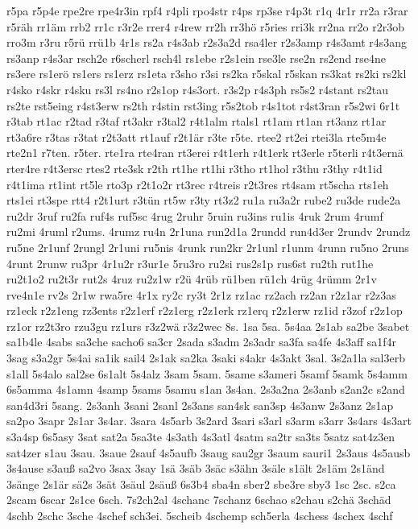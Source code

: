 {r5pa
r5p4e
rpe2re
rpe4r3in
rpf4
r4pli
rpo4str
r4ps
rp3se
r4p3t
r1q
4r1r
rr2a
r3rar
r5räh
rr1äm
rrb2
rr1c
r3r2e
rrer4
r4rew
rr2h
rr3hö
r5ries
rri3k
rr2na
rr2o
r2r3ob
rro3m
r3ru
r5rü
rrü1b
4r1s
rs2a
r4s3ab
r2s3a2d
rsa4ler
r2s3amp
r4s3amt
r4s3ang
rs3anp
r4s3ar
rsch2e
r6scherl
rsch4l
rs1ebe
r2s1ein
rse3le
rse2n
rs2end
rse4ne
rs3ere
rs1erö
rs1ers
rs1erz
rs1eta
r3sho
r3si
rs2ka
r5skal
r5skan
rs3kat
rs2ki
rs2kl
r4sko
r4skr
r4sku
rs3l
rs4no
r2s1op
r4s3ort.
r3s2p
r4s3ph
rs5s2
r4stant
rs2tau
rs2te
rst5eing
r4st3erw
rs2th
r4stin
rst3ing
r5s2tob
r4s1tot
r4st3ran
r5s2wi
6r1t
r3tab
rt1ac
r2tad
r3taf
rt3akr
r3tal2
r4t1alm
rtals1
rt1am
rt1an
rt3anz
rt1ar
rt3a6re
r3tas
r3tat
r2t3att
rt1auf
r2t1är
r3te
r5te.
rtee2
rt2ei
rtei3la
rte5m4e
rte2n1
r7ten.
r5ter.
rte1ra
rte4ran
rt3erei
r4t1erh
r4t1erk
rt3erle
r5terli
r4t3ernä
rter4re
r4t3ersc
rtes2
rte3sk
r2th
rt1he
rt1hi
r3tho
rt1hol
r3thu
r3thy
r4t1id
r4t1ima
rt1int
rt5le
rto3p
r2t1o2r
rt3rec
r4treis
r2t3res
rt4sam
rt5scha
rts1eh
rts1ei
rt3spe
rtt4
r2t1urt
r3tün
rt5w
r3ty
rt3z2
ru1a
ru3a2r
rube2
ru3de
rude2a
ru2dr
3ruf
ru2fa
ruf4s
ruf5sc
4rug
2ruhr
5ruin
ru3ins
ru1is
4ruk
2rum
4rumf
ru2mi
4ruml
r2ums.
4rumz
ru4n
2r1una
run2d1a
2rundd
run4d3er
2rundv
2rundz
ru5ne
2r1unf
2rungl
2r1uni
ru5nis
4runk
run2kr
2r1unl
r1unm
4runn
ru5no
2runs
4runt
2runw
ru3pr
4r1u2r
r3ur1e
5ru3ro
ru2si
rus2s1p
rus6st
ru2th
rut1he
ru2t1o2
ru2t3r
rut2s
4ruz
ru2z1w
r2ü
4rüb
rü1ben
rü1ch
4rüg
4rümm
2r1v
rve4n1e
rv2s
2r1w
rwa5re
4r1x
ry2c
ry3t
2r1z
rz1ac
rz2ach
rz2an
r2z1ar
r2z3as
rz1eck
r2z1eng
rz3ents
r2z1erf
r2z1erg
r2z1erk
rz1erq
r2z1erw
rz1id
r3zof
r2z1op
rz1or
rz2t3ro
rzu3gu
rz1urs
r3z2wä
r3z2wec
8s.
1sa
5sa.
5s4aa
2s1ab
sa2be
3sabet
sa1b4le
4sabs
sa3che
sacho6
sa3cr
2sada
s3adm
2s3adr
sa3fa
sa4fe
4s3aff
sa1f4r
3sag
s3a2gr
5s4ai
sa1ik
sail4
2s1ak
sa2ka
3saki
s4akr
4s3akt
3sal.
3s2a1la
sal3erb
s1all
5s4alo
sal2se
6s1alt
5s4alz
3sam
5sam.
5same
s3ameri
5samf
5samk
5s4amm
6s5amma
4s1amn
4samp
5sams
5samu
s1an
3s4an.
2s3a2na
2s3anb
s2an2c
s2and
san4d3ri
5sang.
2s3anh
3sani
2sanl
2s3ans
san4sk
san3sp
4s3anw
2s3anz
2s1ap
sa2po
3sapr
2s1ar
3s4ar.
3sara
4s5arb
3s2ard
3sari
s3arl
s3arm
s3arr
3s4ars
4s3art
s3a4sp
6s5asy
3sat
sat2a
5sa3te
4s3ath
4s3atl
4satm
sa2tr
sa3ts
5satz
sat4z3en
sat4zer
s1au
3sau.
3saue
2sauf
4s5aufb
3saug
sau2gr
3saum
sauri1
2s3aus
4s5ausb
3s4ause
s3auß
sa2vo
3sax
3say
1sä
3säb
3säc
s3ähn
3säle
s1ält
2s1äm
2s1änd
3sänge
2s1är
sä2s
3sät
3säul
2säuß
6s3b4
sba4n
sber2
sbe3re
sby3
1sc
2sc.
s2ca
2scam
6scar
2s1ce
6sch.
7s2ch2al
4schanc
7schanz
6schao
s2chau
s2chä
3schäd
4schb
2schc
3sche
4schef
sch3ei.
5scheib
4schemp
sch5erla
4schess
4schex
4schf
}
